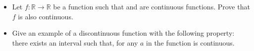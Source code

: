 
\begin{itemize}
	\item Let $f\colon\mathbb{R}\rightarrow\mathbb{R}$ be a function such that
  and
  are continuous
functions. Prove that $f$ is also continuous.
	\item Give an example of a discontinuous function  with the following property: there exists an interval
 such that, for any $a$ in  the function   is continuous.
\end{itemize}
